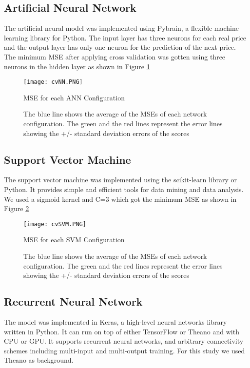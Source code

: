 \subsection{Artificial Neural Network}

The artificial neural model was implemented using Pybrain, a flexible machine learning library for Python. The input layer has three neurons for each real price and the output layer has only one neuron for the prediction of the next price. The minimum MSE after applying cross validation was gotten using three neurons in the hidden layer as shown in  Figure \ref{fig:cvNN}

\begin{figure}[h]
\centering
\texttt{[image: cvNN.PNG]}
\caption{MSE for each ANN Configuration}
\caption*{The blue line shows the average of the MSEs of each network configuration. The green and the red lines represent the error lines showing the +/- standard deviation errors of the scores}
\label{fig:cvNN}
\end{figure}

\subsection{Support Vector Machine}
The support vector machine was implemented using the scikit-learn library or Python. It provides simple and efficient tools for data mining and data analysis. We used a sigmoid kernel and C=3 which got the minimum MSE as shown in Figure \ref{fig:cvSVM}

\begin{figure}[h]
\centering
\texttt{[image: cvSVM.PNG]}
\caption{MSE for each SVM Configuration}
\caption*{The blue line shows the average of the MSEs of each network configuration. The green and the red lines represent the error lines showing the +/- standard deviation errors of the scores}
\label{fig:cvSVM}
\end{figure}

\subsection{Recurrent Neural Network}

The model was implemented in Keras, a high-level neural networks library written in Python. It can run on top of either TensorFlow or Theano and with CPU or GPU. It supports recurrent neural networks, and arbitrary connectivity schemes including multi-input and multi-output training. For this study we used Theano as background.

